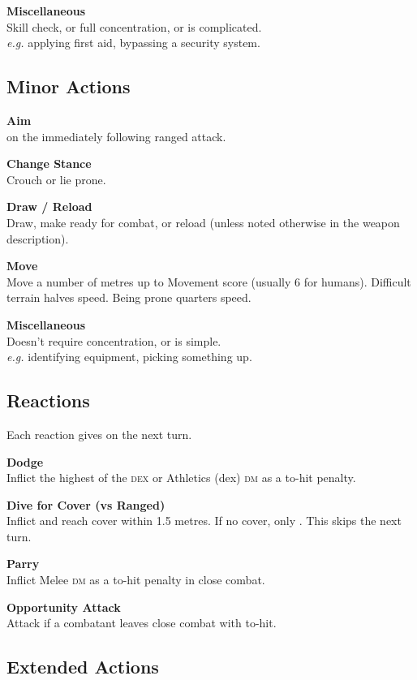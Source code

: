 \documentclass{cheatsheet}
\begin{document}
\begin{multicols}{3}
\textbf{Miscellaneous}\\
Skill check, or full concentration, or is complicated.\\
\textit{e.g.} applying first aid, bypassing a security system.

\subsection{Minor Actions}

\textbf{Aim}\\
 on the immediately following ranged attack.

\textbf{Change Stance}\\
Crouch or lie prone.

\textbf{Draw / Reload}\\
Draw, make ready for combat, or reload (unless noted otherwise in the
weapon description).

\textbf{Move}\\
Move a number of metres up to Movement score (usually 6 for humans).
Difficult terrain halves speed.  Being prone quarters speed.

\textbf{Miscellaneous}\\
Doesn't require concentration, or is simple.\\
\textit{e.g.} identifying equipment, picking something up.

\subsection{Reactions}

Each reaction gives  on the next turn.

\textbf{Dodge}\\
Inflict the highest of the \textsc{dex} or Athletics (dex) \textsc{dm}
as a to-hit penalty.

\textbf{Dive for Cover (vs Ranged)}\\
Inflict  and reach cover within 1.5 metres.  If no cover,
only .  This skips the next turn.

\textbf{Parry}\\
Inflict Melee \textsc{dm} as a to-hit penalty in close combat.

\textbf{Opportunity Attack}\\
Attack if a combatant leaves close combat with  to-hit.

\subsection{Extended Actions}


\end{multicols}
\end{document}
